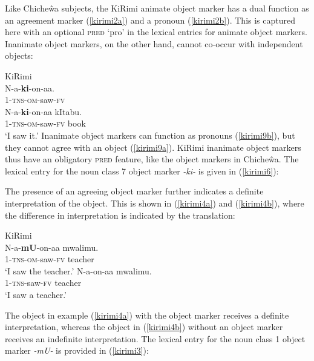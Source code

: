 \documentclass[output=paper,hidelinks]{langscibook}
\begin{document}
Like Chiche\^{w}a subjects,  the KiRimi animate object marker   has  a dual function as an agreement marker  (\ref{kirimi2a}) and a  pronoun (\ref{kirimi2b}).  This is captured here with  an optional \textsc{pred} `pro' in the lexical entries for animate object markers.  Inanimate object markers, on the other hand,  cannot co-occur with independent objects: 
 
\ea  \label{kirimi9}KiRimi\\
 \ea\label{kirimi9b}    \gll  N-a-{\bf ki}-on-aa. \\
   1-\textsc{tns}-\textsc{om}-saw-\textsc{fv}       \\
\ex\label{kirimi9a} \gll *N-a-{\bf ki}-on-aa kItabu. \\
 { }1-\textsc{tns}-\textsc{om}-saw-\textsc{fv} book\\    
 \glt `I saw it.'  
\z\z 
Inanimate object markers can function as pronouns (\ref{kirimi9b}), but they cannot agree with an object (\ref{kirimi9a}).    KiRimi inanimate object markers   thus have an obligatory \textsc{pred} feature,  like the  object markers in Chiche\^{w}a.  The lexical entry for the noun class 7 object marker  \textit{-ki-} is  given  in  (\ref{kirimi6}):
 
  
 \ea \label{kirimi6}  
\z

 \noindent    The  presence of an  agreeing object  marker  further indicates a definite interpretation of the object.  This is shown in  (\ref{kirimi4a}) and (\ref{kirimi4b}), where the  difference in interpretation     is indicated  by the  translation:  
  
 \ea \label{kirimi4}KiRimi\\
 \ea\label{kirimi4a} \gll  N-a-{\bf mU}-on-aa mwalimu.  \\
   1-\textsc{tns}-\textsc{om}-saw-\textsc{fv}  teacher   \\
 \glt `I  saw  the teacher.'
 \ex \label{kirimi4b} \gll  N-a-on-aa mwalimu. \\
   1-\textsc{tns}-saw-\textsc{fv}  teacher   \\
 \glt `I  saw  a teacher.'
 \z\z
 
 The object in example (\ref{kirimi4a}) with the  object marker receives  a definite  interpretation, whereas the object  in  (\ref{kirimi4b}) without  an  object  marker receives an  indefinite interpretation.  The lexical  entry  for the noun class 1 object marker \textit{-mU-} is provided  in (\ref{kirimi3}):
 
\end{document}
